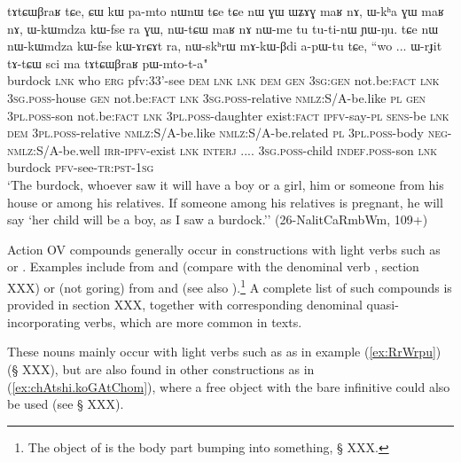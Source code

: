 \begin{exe}
\ex \label{ex:tAtCWBraR}
\gll tɤtɕɯβraʁ tɕe, ɕɯ kɯ pa-mto nɯnɯ tɕe tɕe nɯ ɣɯ ɯʑɤɣ maʁ nɤ, ɯ-kʰa ɣɯ maʁ nɤ,  ɯ-kɯmdza kɯ-fse ra ɣɯ, nɯ-tɕɯ maʁ nɤ nɯ-me tu tu-ti-nɯ ɲɯ-ŋu. tɕe nɯ nɯ-kɯmdza kɯ-fse kɯ-ɤrɕɤt ra, nɯ-skʰrɯ mɤ-kɯ-βdi a-pɯ-tu tɕe, ``wo ... ɯ-rɟit tɤ-tɕɯ sci ma tɤtɕɯβraʁ pɯ-mto-t-a" \\
burdock \textsc{lnk} who \textsc{erg}  pfv:3\fl{}3'-see \textsc{dem} \textsc{lnk} \textsc{lnk} \textsc{dem} \textsc{gen} \textsc{3sg:gen} not.be:\textsc{fact} \textsc{lnk} \textsc{3sg.poss}-house \textsc{gen} not.be:\textsc{fact} \textsc{lnk}  \textsc{3sg.poss}-relative \textsc{nmlz}:S/A-be.like \textsc{pl} \textsc{gen} \textsc{3pl.poss}-son not.be:\textsc{fact} \textsc{lnk} \textsc{3pl.poss}-daughter exist:\textsc{fact} \textsc{ipfv}-say-\textsc{pl} \textsc{sens}-be \textsc{lnk} \textsc{dem} \textsc{3pl.poss}-relative  \textsc{nmlz}:S/A-be.like  \textsc{nmlz}:S/A-be.related \textsc{pl}  \textsc{3pl.poss}-body  \textsc{neg}-\textsc{nmlz}:S/A-be.well \textsc{irr}-\textsc{ipfv}-exist \textsc{lnk} \textsc{interj} .... \textsc{3sg.poss}-child \textsc{indef.poss}-son \textsc{lnk} burdock \textsc{pfv}-see-\textsc{tr:pst}-\textsc{1sg} \\
\glt `The burdock, whoever saw it will have a boy or a girl, him or someone from his house or among his relatives. If someone among his relatives is pregnant, he will say `her child will be a boy, as I saw a burdock.'' (26-NalitCaRmbWm, 109+)
\end{exe}

Action OV compounds generally occur in constructions with light verbs such as  or . Examples include  from  and  (compare with the denominal verb  , section XXX) or  (not goring) from  and   (see also ).\footnote{The object of  is the body part bumping into something, § XXX.} A complete list of such compounds is provided in section XXX, together with corresponding denominal quasi-incorporating verbs, which are more common in texts. 

These nouns mainly occur with light verbs such as  as in example (\ref{ex:RrWrpu}) (§ XXX), but are also found in other constructions as in (\ref{ex:chAtshi.koGAtChom}), where a free object  with the bare infinitive  could also be used (see § XXX).

